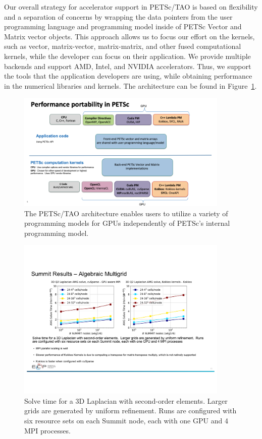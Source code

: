Our overall strategy for accelerator support in PETSc/TAO is based on flexibility and a separation 
of concerns by wrapping the data pointers from the user programming language and programming 
model inside of PETSc Vector and Matrix vector objects.  This approach allows us to focus 
our effort on the kernels, such as vector, matrix-vector, matrix-matrix, and other fused 
computational kernels, while the developer can focus on their application.  We provide 
multiple backends and support AMD, Intel, and NVIDIA accelerators.  Thus, we support 
the tools that the application developers are using, while obtaining performance in 
the numerical libraries and kernels.  The architecture can be found in 
Figure~\ref{fig:petsc-tao-fig}.

\begin{figure}
\centering
\includegraphics[trim = 0.3in 0.3in 1.7in 0.2in, clip, width=0.9\textwidth]{projects/2.3.3-MathLibs/2.3.3.06-PETSc-TAO/petsc_arch}
\caption{The PETSc/TAO architecture enables users to utilize a variety of programming
models for GPUs independently of PETSc's internal programming model.}
\label{fig:petsc-tao-fig}
\end{figure}

\begin{figure}[h!]
\centering
\includegraphics[trim = 1in 3.6in 1in 2in, clip, width=0.9\textwidth]{projects/2.3.3-MathLibs/2.3.3.06-PETSc-TAO/petsc_perf}
\caption{Solve time for a 3D Laplacian with second-order elements.  Larger grids are generated by uniform refinement.  Runs are configured with six resource sets on each Summit node, each with one GPU and 4 MPI processes.}
\label{fig:petsc-tao-perf}
\end{figure}

